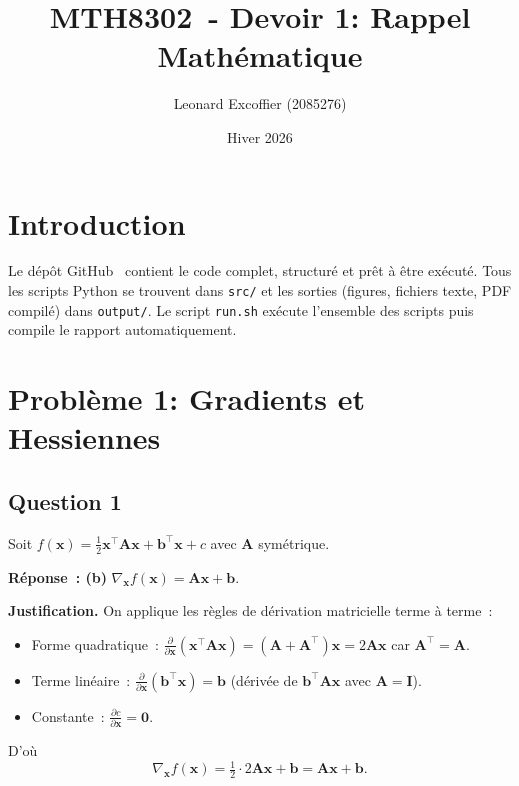 \documentclass[12pt,letterpaper]{article}
\title{MTH8302~- Devoir 1: Rappel Mathématique}
\author{Leonard Excoffier (2085276)}
\date{Hiver 2026}
\begin{document}
\maketitle

\tableofcontents

\section*{Introduction}

Le dépôt GitHub~\cite{repo} contient le code complet, structuré et prêt à être exécuté.
Tous les scripts Python se trouvent dans \texttt{src/} et les sorties (figures, fichiers texte, PDF compilé) dans \texttt{output/}.
Le script \texttt{run.sh} exécute l'ensemble des scripts puis compile le rapport automatiquement.

\section{Problème 1: Gradients et Hessiennes}

\subsection{Question 1}

Soit $f(\mathbf{x}) = \frac{1}{2}\mathbf{x}^\top \mathbf{A}\mathbf{x} + \mathbf{b}^\top\mathbf{x} + c$ avec $\mathbf{A}$ symétrique.

\textbf{Réponse~: (b)} $\nabla_{\mathbf{x}} f(\mathbf{x}) = \mathbf{A}\mathbf{x} + \mathbf{b}$.

\textbf{Justification.}
On applique les règles de dérivation matricielle terme à terme~:
\begin{itemize}
  \item Forme quadratique~: $\frac{\partial}{\partial \mathbf{x}}(\mathbf{x}^\top\mathbf{A}\mathbf{x}) = (\mathbf{A} + \mathbf{A}^\top)\mathbf{x} = 2\mathbf{A}\mathbf{x}$ car $\mathbf{A}^\top = \mathbf{A}$.
  \item Terme linéaire~: $\frac{\partial}{\partial \mathbf{x}}(\mathbf{b}^\top\mathbf{x}) = \mathbf{b}$ (dérivée de $\mathbf{b}^\top\mathbf{A}\mathbf{x}$ avec $\mathbf{A} = \mathbf{I}$).
  \item Constante~: $\frac{\partial c}{\partial \mathbf{x}} = \mathbf{0}$.
\end{itemize}
D'où
\[
\nabla_{\mathbf{x}} f(\mathbf{x}) = \tfrac{1}{2}\cdot 2\mathbf{A}\mathbf{x} + \mathbf{b} = \boxed{\mathbf{A}\mathbf{x} + \mathbf{b}}.
\]
\end{document}
